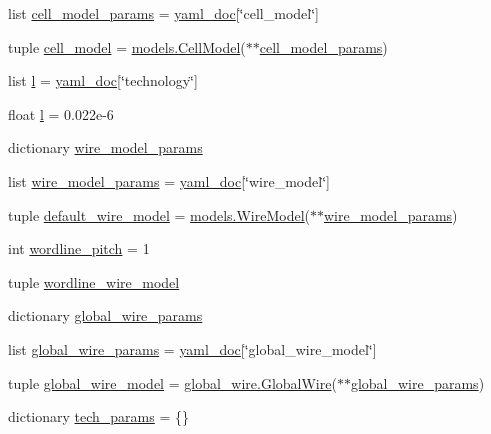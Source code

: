 \begin{DoxyCompactItemize}
list \hyperlink{classtable_a252e7ab94c46dafbdab734b5ceedc267}{cell\_\-model\_\-params} = \hyperlink{classtable_a068029d2d6ede2fab66a603c83626ed1}{yaml\_\-doc}\mbox{[}\char`\"{}cell\_\-model\char`\"{}\mbox{]}
\item 
tuple \hyperlink{classtable_af189382302593d719e7099c7ba0170c9}{cell\_\-model} = \hyperlink{classmodels_1_1CellModel}{models.CellModel}($\ast$$\ast$\hyperlink{classtable_affb2ec85d44634a9b5e4791b756489ca}{cell\_\-model\_\-params})
\item 
list \hyperlink{classtable_ac52d431b62e008aea842db9c5a74c826}{l} = \hyperlink{classtable_a068029d2d6ede2fab66a603c83626ed1}{yaml\_\-doc}\mbox{[}\char`\"{}technology\char`\"{}\mbox{]}
\item 
float \hyperlink{classtable_a1a42a6604769284e9187575b0abc876d}{l} = 0.022e-\/6
\item 
dictionary \hyperlink{classtable_aebf2e2c6c4d0ec6026901ca8e6679a5d}{wire\_\-model\_\-params}
\item 
list \hyperlink{classtable_a26f8b3354769a96a7c51206b89d2a95e}{wire\_\-model\_\-params} = \hyperlink{classtable_a068029d2d6ede2fab66a603c83626ed1}{yaml\_\-doc}\mbox{[}\char`\"{}wire\_\-model\char`\"{}\mbox{]}
\item 
tuple \hyperlink{classtable_aa789a61b22c94a65f51a3505311b03fc}{default\_\-wire\_\-model} = \hyperlink{classmodels_1_1WireModel}{models.WireModel}($\ast$$\ast$\hyperlink{classtable_aebf2e2c6c4d0ec6026901ca8e6679a5d}{wire\_\-model\_\-params})
\item 
int \hyperlink{classtable_a815376b65b49c50ba7ed9c5ced5ca4a4}{wordline\_\-pitch} = 1
\item 
tuple \hyperlink{classtable_a5c3be16096865c6c55cfb6eebaad2cee}{wordline\_\-wire\_\-model}
\item 
dictionary \hyperlink{classtable_afa4455260ca054710631a16d93ad1848}{global\_\-wire\_\-params}
\item 
list \hyperlink{classtable_a9dce6b1c97baf3ee2ce1c6fe2e90cf78}{global\_\-wire\_\-params} = \hyperlink{classtable_a068029d2d6ede2fab66a603c83626ed1}{yaml\_\-doc}\mbox{[}\char`\"{}global\_\-wire\_\-model\char`\"{}\mbox{]}
\item 
tuple \hyperlink{classtable_a2c6d189f908ac28d316ae1afa2a18324}{global\_\-wire\_\-model} = \hyperlink{classglobal__wire_1_1GlobalWire}{global\_\-wire.GlobalWire}($\ast$$\ast$\hyperlink{classtable_afa4455260ca054710631a16d93ad1848}{global\_\-wire\_\-params})
\item 
dictionary \hyperlink{classtable_af4623354d0c8319c4cb046c7b3e17ddb}{tech\_\-params} = \{\}
$$
\end{DoxyCompactItemize}

